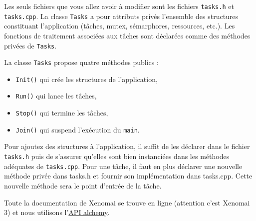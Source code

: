 \documentclass[11pt]{paper}
\begin{document}
 Les seuls fichiers que vous allez avoir à modifier sont les fichiers {\tt tasks.h} et {\tt tasks.cpp}. La classe {\tt Tasks} a pour attributs privés l'ensemble des structures constituant l'application (tâches, mutex, sémarphores, ressources, etc.). Les fonctions de traitement associées aux tâches sont déclarées comme des méthodes privées de {\tt Tasks}.
 
 La classe {\tt Tasks} propose quatre méthodes publics :
 \begin{itemize}
 	\item {\tt Init()} qui crée les structures de l'application,
	\item {\tt Run()} qui lance les tâches,
	\item {\tt Stop()} qui termine les tâches,
	\item {\tt Join()} qui suspend l'exécution du {\tt main}.\\
 \end{itemize}

Pour ajoutez des structures à l'application, il suffit de les déclarer dans le fichier {\tt tasks.h} puis de s'assurer qu'elles sont bien instanciées dans les méthodes adéquates de {\tt tasks.cpp}. Pour une tâche, il faut en plus déclarer une nouvelle méthode privée dans {tasks.h} et fournir son implémentation dans {tasks.cpp}. Cette nouvelle méthode sera le point d'entrée de la tâche.

Toute la documentation de Xenomai se trouve en ligne (attention c'est Xenomai 3) et nous utilisons l'\href{https://xenomai.org/documentation/xenomai-3/html/xeno3prm/group__alchemy.html}{API alchemy}.
\end{document}
